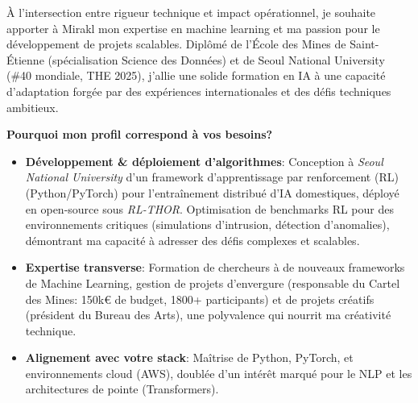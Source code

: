 
\date{21 Mars 2025}
\makelettertitle

À l'intersection entre rigueur technique et impact opérationnel, je souhaite apporter à Mirakl mon expertise en machine learning et ma passion pour le développement de projets scalables. Diplômé de l'École des Mines de Saint-Étienne (spécialisation Science des Données) et de Seoul National University (\#40 mondiale, THE 2025), j'allie une solide formation en IA à une capacité d'adaptation forgée par des expériences internationales et des défis techniques ambitieux.

\textbf{Pourquoi mon profil correspond à vos besoins?}
\begin{itemize}
    \item \textbf{Développement \& déploiement d'algorithmes}:
          Conception à \textit{Seoul National University} d'un framework d'apprentissage par renforcement (RL) (Python/PyTorch) pour l'entraînement distribué d'IA domestiques, déployé en open-source sous \textit{RL-THOR}.
          Optimisation de benchmarks RL pour des environnements critiques (simulations d'intrusion, détection d'anomalies), démontrant ma capacité à adresser des défis complexes et scalables.
    \item \textbf{Expertise transverse}: Formation de chercheurs à de nouveaux frameworks de Machine Learning, gestion de projets d'envergure (responsable du Cartel des Mines: 150k€ de budget, 1800+ participants) et de projets créatifs (président du Bureau des Arts), une polyvalence qui nourrit ma créativité technique.
    \item \textbf{Alignement avec votre stack}: Maîtrise de Python, PyTorch, et environnements cloud (AWS), doublée d'un intérêt marqué pour le NLP et les architectures de pointe (Transformers).
\end{itemize}
\vspace{7pt}

